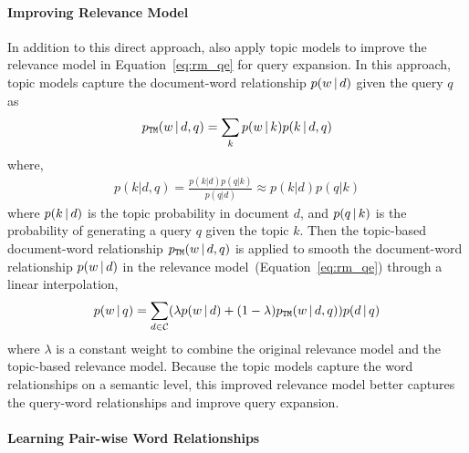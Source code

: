 \paragraph{Improving Relevance Model}

In addition to this direct approach, \citet{Yi-2009} also apply topic
models to improve the relevance model in Equation~\ref{eq:rm_qe} for
query expansion. In this approach, topic models capture
the document-word relationship $p(w \, | \, d)$ given the query $q$ as
\begin{align}
p_{\texttt{TM}}(w \, | \, d, q) = \sum_k p(w \, | \, k) p(k \, | \, d, q)
\end{align}
where,
\begin{align}
p(k|d,q) = \frac{p(k|d)p(q|k)}{p(q|d)} \approx p(k|d)p(q|k)
\end{align}
where $p(k \, | \, d)$ is the topic probability in document $d$, and $p(q
\, | \, k)$ is the probability of generating a query $q$ given the topic $k$. Then
the topic-based document-word relationship $p_{\texttt{TM}}(w \, | \, d, q)$ is
applied to smooth the document-word relationship $p(w \, | \, d)$ in the
relevance model~(Equation~\ref{eq:rm_qe}) through a linear
interpolation,
\begin{align}
p(w \, | \, q) = \sum_{d \in \mathcal{C}} (\lambda p(w \, | \, d) + (1 -
  \lambda)p_{\texttt{TM}}(w \, | \, d,q))p(d \, | \, q)
\end{align}
where $\lambda$ is a constant weight to combine the original relevance
model and the topic-based relevance model. Because the topic models
capture the word relationships on a semantic level, this improved
relevance model better captures the query-word relationships and
improve query expansion.

\paragraph{Learning Pair-wise Word Relationships}

